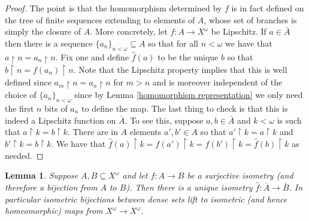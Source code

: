\documentclass[leqno,11pt]{amsart}
\newtheorem{lemma}[theorem]{Lemma}
\theoremstyle{definition}
\theoremstyle{remark}
\def\hook{\upharpoonright}
\def\baire{\omega^\omega}
\begin{document}
\begin{proof}
    The point is that the homomorphism determined by $f$ is in fact defined on the tree of finite sequences extending to elements of $A$, whose set of branches is simply the closure of $A$. More concretely, let $f:A \to X^\omega$ be Lipschitz. If $a \in \bar{A}$ then there is a sequence $\{a_n\}_{n < \omega} \subseteq A$ so that for all $n < \omega$ we have that $a \hook n = a_n \hook n$. Fix one and define $\hat{f}(a)$ to be the unique $b$ so that $b\hook n = f(a_n) \hook n$. Note that the Lipschitz property implies that this is well defined since $a_m \hook n = a_n \hook n$ for $m >  n$ and is moreover independent of the choice of $\{a_n\}_{n < \omega}$ since by Lemma \ref{homomorphism representation} we only need the first $n$ bits of $a_n$ to define the map. The last thing to check is that this is indeed a Lipschitz function on $\bar{A}$. To see this, suppose $a, b \in \bar{A}$ and $k < \omega$ is such that $a\hook k = b\hook k$. There are in $A$ elements $a', b' \in A$ so that $a' \hook k = a\hook k$ and $b' \hook k = b\hook k$. We have that $\hat{f} (a)\hook k =f(a')\hook k = f (b') \hook k = \hat{f} (b) \hook k$ as needed. 

\end{proof}

\begin{lemma}
    Suppose $A, B \subseteq X^\omega$ and let $f:A \to B$ be a surjective isometry (and therefore a bijection from $A$ to $B$). Then there is a unique isometry $\hat{f}:\bar{A} \to \bar{B}$. In particular isometric bijections between dense sets lift to isometric (and hence homeomorphic) maps from $X^\omega \to X^\omega$. \label{lifting isometries}
\end{lemma}
\end{document}
